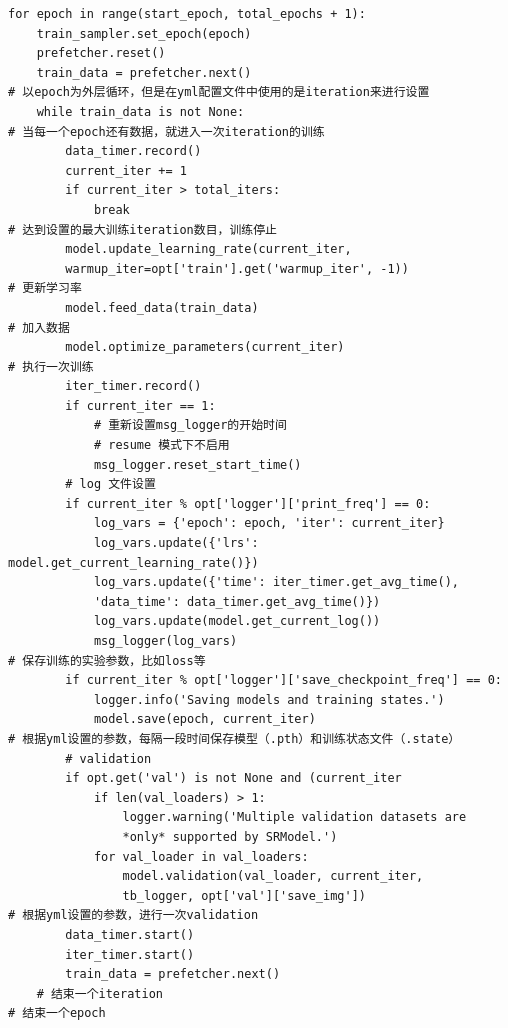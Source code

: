 \documentclass[../main.tex]{subfiles}
\begin{document}
\begin{enumerate}
\begin{enumerate}
\begin{verbatim}
for epoch in range(start_epoch, total_epochs + 1):
    train_sampler.set_epoch(epoch)
    prefetcher.reset()
    train_data = prefetcher.next()
# 以epoch为外层循环，但是在yml配置文件中使用的是iteration来进行设置
    while train_data is not None:
# 当每一个epoch还有数据，就进入一次iteration的训练
        data_timer.record()
        current_iter += 1
        if current_iter > total_iters:
            break
# 达到设置的最大训练iteration数目，训练停止
        model.update_learning_rate(current_iter,
        warmup_iter=opt['train'].get('warmup_iter', -1))
# 更新学习率
        model.feed_data(train_data)
# 加入数据
        model.optimize_parameters(current_iter)
# 执行一次训练
        iter_timer.record()
        if current_iter == 1:
            # 重新设置msg_logger的开始时间
            # resume 模式下不启用
            msg_logger.reset_start_time()
        # log 文件设置
        if current_iter % opt['logger']['print_freq'] == 0:
            log_vars = {'epoch': epoch, 'iter': current_iter}
            log_vars.update({'lrs': model.get_current_learning_rate()})
            log_vars.update({'time': iter_timer.get_avg_time(),
            'data_time': data_timer.get_avg_time()})
            log_vars.update(model.get_current_log())
            msg_logger(log_vars)
# 保存训练的实验参数，比如loss等
        if current_iter % opt['logger']['save_checkpoint_freq'] == 0:
            logger.info('Saving models and training states.')
            model.save(epoch, current_iter)
# 根据yml设置的参数，每隔一段时间保存模型（.pth）和训练状态文件（.state）
        # validation
        if opt.get('val') is not None and (current_iter
            if len(val_loaders) > 1:
                logger.warning('Multiple validation datasets are
                *only* supported by SRModel.')
            for val_loader in val_loaders:
                model.validation(val_loader, current_iter,
                tb_logger, opt['val']['save_img'])
# 根据yml设置的参数，进行一次validation
        data_timer.start()
        iter_timer.start()
        train_data = prefetcher.next()
    # 结束一个iteration
# 结束一个epoch
\end{verbatim}

\end{enumerate}



\end{enumerate}
\end{document}
